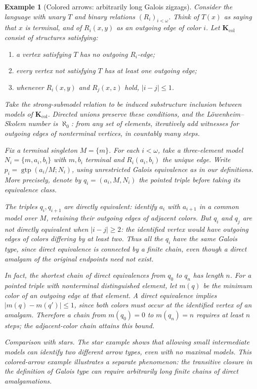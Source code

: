 \documentclass[11pt]{article}
\newcommand{\K}{\mathbf K}
\newcommand{\gtp}{\operatorname{gtp}}
\theoremstyle{plain}
\newtheorem{example}[definition]{Example}
\begin{document}
\begin{example}[Colored arrows: arbitrarily long Galois zigzags]
\label{ex:colored-arrows-zigzags}
Consider the language with unary $T$ and binary
relations $(R_i)_{i<\omega}$. Think of $T(x)$ as
saying that $x$ is terminal, and of $R_i(x,y)$
as an outgoing edge of color $i$. Let
$\K_{\mathrm{col}}$ consist of structures satisfying:
\begin{enumerate}[label=\textup{(\roman*)}]
\item a vertex satisfying $T$ has no
outgoing $R_i$-edge;
\item every vertex not satisfying $T$
has at least one outgoing edge;
\item whenever $R_i(x,y)$ and $R_j(x,z)$
hold, $|i-j|\leq 1$.
\end{enumerate}
Take the strong-submodel relation to be
induced substructure inclusion between models
of $\K_{\mathrm{col}}$. Directed unions
preserve these conditions, and the
L\"owenheim--Skolem number is $\aleph_0$:
from any set of elements, iteratively add
witnesses for outgoing edges of nonterminal
vertices, in countably many steps.

Fix a terminal singleton $M=\{m\}$. For each
$i<\omega$, take a three-element model
$N_i=\{m,a_i,b_i\}$ with $m,b_i$ terminal
and $R_i(a_i,b_i)$ the unique edge. Write
$p_i=\gtp(a_i/M;N_i)$, using unrestricted
Galois equivalence as in our definitions.
More precisely, denote by
$q_i=(a_i,M,N_i)$ the \emph{pointed triple}
before taking its equivalence class.

The triples $q_i,q_{i+1}$ are directly
equivalent: identify $a_i$ with $a_{i+1}$
in a common model over $M$, retaining
their outgoing edges of adjacent colors.
But $q_i$ and $q_j$ are not directly
equivalent when $|i-j|\geq 2$: the
identified vertex would have outgoing
edges of colors differing by at least two.
Thus all the $q_i$ have the same \emph{Galois
type}, since direct equivalence is connected
by a finite chain, even though a direct
amalgam of the original endpoints need
not exist.

In fact, the shortest chain of direct
equivalences from $q_0$ to $q_n$
has length $n$. For a pointed triple
with nonterminal distinguished element,
let $m(q)$ be the minimum color of
an outgoing edge at that element.
A direct equivalence implies
$|m(q)-m(q')|\leq 1$, since both colors
must occur at the identified vertex
of an amalgam. Therefore a chain from
$m(q_0)=0$ to $m(q_n)=n$ requires
at least $n$ steps; the adjacent-color
chain attains this bound.

\emph{Comparison with stars.} The star
example shows that allowing \emph{small}
intermediate models can identify two
different arrow types, even with no
maximal models. This colored-arrow example
illustrates a separate phenomenon:
the transitive closure in the definition
of Galois type can require arbitrarily
long finite chains of direct amalgamations.
\end{example}
\end{document}
